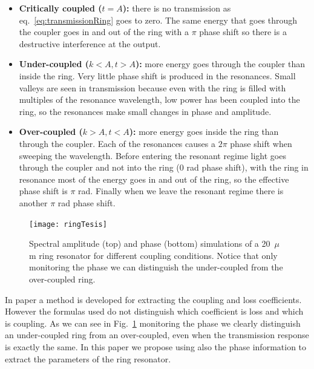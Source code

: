 \documentclass[journal]{IEEEtran}
\begin{document}
\begin{itemize}
 \item \textbf{Critically coupled ($t=A$):}  there is no transmission as eq.~\ref{eq:transmissionRing} goes to zero. The same energy that goes through the coupler goes in and out of the ring with a $\pi$ phase shift so there is a destructive interference at the output.
 
 \item \textbf{Under-coupled ($k<A,t>A$):}  more energy goes through the coupler than inside the ring. Very little phase shift is produced in the resonances. Small valleys are seen in transmission because even with the ring is filled with multiples of the resonance wavelength, low power has been coupled into the ring, so the resonances make small changes in phase and amplitude.	
 
 \item \textbf{Over-coupled ($k>A,t<A$):}  more energy goes inside the ring than through the coupler. Each of the resonances causes a $2\pi$ phase shift when sweeping the wavelength. Before entering the resonant regime light goes through the coupler and not into the ring (0 rad phase shift), with the ring in resonance most of the energy goes in and out of the ring, so the effective phase shift is $\pi$ rad. Finally when we leave the resonant regime there is another $\pi$ rad phase shift.
\end{itemize}

\begin{figure}[htb]
    \centering
    \texttt{[image: ringTesis]}
    \caption{Spectral amplitude (top) and phase (bottom) simulations of a 20~$\mu$m ring resonator for different coupling conditions. Notice that only monitoring the phase we can distinguish the under-coupled from the over-coupled ring.}
    \label{fig:ringDifferentCoupling}
\end{figure}

In paper \cite{McKinnon2009} a method is developed for extracting the coupling and loss coefficients. However the formulas used do not distinguish which coefficient is loss and which is coupling. As we can see in Fig.~\ref{fig:ringDifferentCoupling} monitoring the phase we clearly distinguish an under-coupled ring from an over-coupled, even when the transmission response is exactly the same. In this paper we propose using also the phase information to extract the parameters of the ring resonator.


\end{document}
